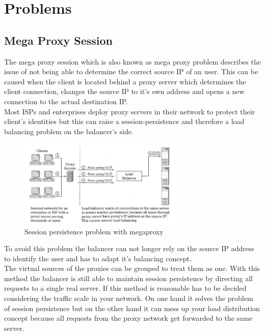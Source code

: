 \documentclass[12p]{article}
\begin{document}
	\newpage
	\section{Problems}
	\subsection{Mega Proxy Session}
	The mega proxy session which is also known as mega proxy problem describes the issue of not being able to determine the correct source IP of an user. This can be caused when the client is located behind a proxy server which determines the client connection, changes the source IP to it's own address and opens a new connection to the actual destination IP.\\
	Most ISPs and enterprises deploy proxy servers in their network to protect their client's identities but this can raise a session-persistence and therefore a load balancing problem on the balancer's side.\\
	
	\begin{figure}[h!]
		\centering
		\includegraphics[width=0.7\textwidth]{img/SessionPersistanceProblem.png}
		\caption{Session persistence problem with megaproxy}
	\end{figure}
	
	To avoid this problem the balancer can not longer rely on the source IP address to identify the user and has to adapt it's balancing concept.\\
	The virtual sources of the proxies can be grouped to treat them as one. With this method the balancer is still able to maintain session persistence by directing all requests to a single real server. If this method is reasonable has to be decided considering the traffic scale in your network. On one hand it solves the problem of session persistence but on the other hand it can mess up your load distribution concept because all requests from the proxy network get forwarded to the same server.
	
\end{document}
